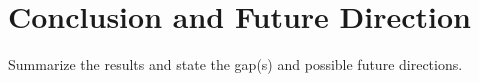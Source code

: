 \documentclass[letterpaper,11 pt]{article}
\newtheorem{theorem}{Theorem}
\newtheorem{lemma}{Lemma}
\newtheorem{assumption}{Assumption}
\begin{document}
%






\section{Conclusion and Future Direction}
Summarize the results and state the gap(s) and possible future directions.


    
 
\end{document}
